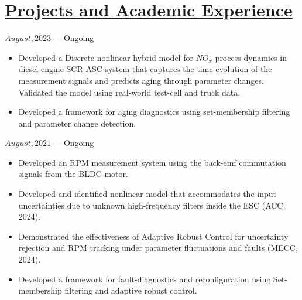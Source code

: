 \section*{\underline{Projects and Academic Experience}}
\noindent {} \hfill $August, 2023 - $ Ongoing
\begin{itemize}
        \item Developed a Discrete nonlinear hybrid model for $NO_x$ process dynamics in diesel engine SCR-ASC system that captures the time-evolution of the measurement signals and predicts aging through parameter changes. Validated the model using real-world test-cell and truck data.
        \item Developed a framework for aging diagnostics using set-membership filtering and parameter change detection.
\end{itemize}

\medskip

\noindent {} \hfill $August, 2021 - $ Ongoing
\begin{itemize}
        \item Developed an RPM measurement system using the back-emf commutation signals from the BLDC motor.
        \item Developed and identified nonlinear model that accommodates the input uncertainties due to unknown high-frequency filters inside the ESC (ACC, 2024).
        \item Demonstrated the effectiveness of Adaptive Robust Control for uncertainty rejection and RPM tracking under parameter fluctuations and faults (MECC, 2024).
        \item Developed a framework for fault-diagnostics and reconfiguration using Set-membership filtering and adaptive robust control.
\end{itemize}

\medskip

